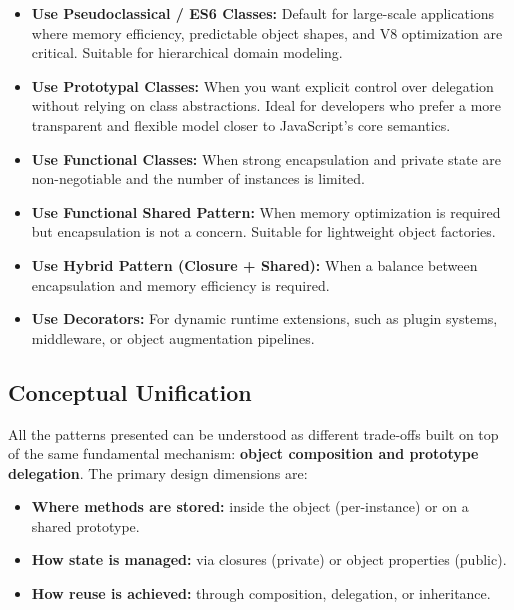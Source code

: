 \documentclass{scrbook}
\begin{document}
\begin{itemize}
    \item \textbf{Use Pseudoclassical / ES6 Classes:} Default for large-scale applications where memory efficiency, predictable object shapes, and V8 optimization are critical. Suitable for hierarchical domain modeling.
    
    \item \textbf{Use Prototypal Classes:} When you want explicit control over delegation without relying on class abstractions. Ideal for developers who prefer a more transparent and flexible model closer to JavaScript's core semantics.
    
    \item \textbf{Use Functional Classes:} When strong encapsulation and private state are non-negotiable and the number of instances is limited.
    
    \item \textbf{Use Functional Shared Pattern:} When memory optimization is required but encapsulation is not a concern. Suitable for lightweight object factories.
    
    \item \textbf{Use Hybrid Pattern (Closure + Shared):} When a balance between encapsulation and memory efficiency is required.
    
    \item \textbf{Use Decorators:} For dynamic runtime extensions, such as plugin systems, middleware, or object augmentation pipelines.
\end{itemize}

\subsection{Conceptual Unification}

All the patterns presented can be understood as different trade-offs built on top of the same fundamental mechanism: \textbf{object composition and prototype delegation}. The primary design dimensions are:

\begin{itemize}
    \item \textbf{Where methods are stored:} inside the object (per-instance) or on a shared prototype.
    \item \textbf{How state is managed:} via closures (private) or object properties (public).
    \item \textbf{How reuse is achieved:} through composition, delegation, or inheritance.
\end{itemize}
\end{document}
